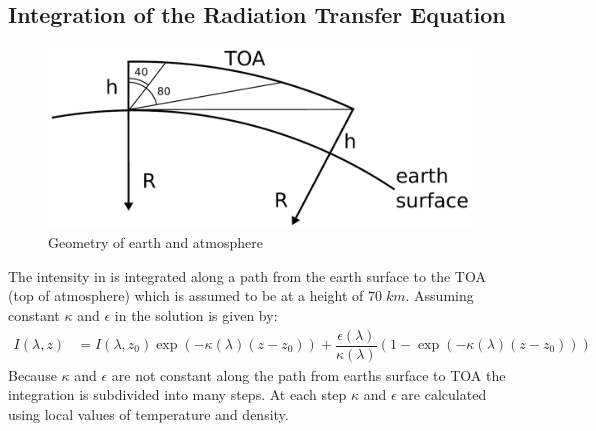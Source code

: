 \subsection{Integration of the Radiation Transfer Equation}

\begin{figure}[ht]
	\includegraphics[width=12cm]{figures/earth_surface_toa.pdf}
	\caption{Geometry of earth and atmosphere}
	\label{fig:geometry}
\end{figure}

The intensity in  is integrated along a path from the earth surface to the TOA (top of atmosphere) which is assumed to be at a height of $70\; km$. Assuming constant $\kappa$ and $\epsilon$ in  the solution is given by:
\begin{align}
	I(\lambda,z) &= I(\lambda,z_0) \exp( -  \kappa(\lambda) (z-z_0)) + \dfrac{\epsilon(\lambda)}{\kappa(\lambda)} \left(1 - \exp( - \kappa(\lambda) (z-z_0))\right)
\end{align}
Because $\kappa$ and $\epsilon$ are not constant along the path from earths surface to TOA the integration is subdivided into many steps. At each step $\kappa$ and $\epsilon$ are calculated using local values of temperature and density.

